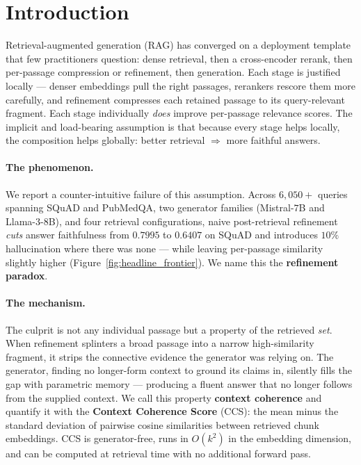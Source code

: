 \section{Introduction}
\label{sec:intro}

Retrieval-augmented generation (RAG) has converged on a deployment
template that few practitioners question: dense retrieval, then a
cross-encoder rerank, then per-passage compression or refinement,
then generation. Each stage is justified locally --- denser embeddings
pull the right passages, rerankers rescore them more carefully, and
refinement compresses each retained passage to its query-relevant
fragment. Each stage individually \emph{does} improve per-passage
relevance scores. The implicit and load-bearing assumption is that
because every stage helps locally, the composition helps globally:
better retrieval $\Rightarrow$ more faithful answers.

\paragraph{The phenomenon.} We report a counter-intuitive failure of
this assumption. Across $6{,}050+$ queries spanning SQuAD and
PubMedQA, two generator families (Mistral-$7$B and Llama-$3$-$8$B), and
four retrieval configurations, naive post-retrieval refinement
\emph{cuts} answer faithfulness from $0.7995$ to $0.6407$ on SQuAD and
introduces $10\%$ hallucination where there was none --- while leaving
per-passage similarity slightly higher
(Figure~\ref{fig:headline_frontier}). We name this the
\textbf{refinement paradox}.

\paragraph{The mechanism.} The culprit is not any individual passage
but a property of the retrieved \emph{set}. When refinement splinters
a broad passage into a narrow high-similarity fragment, it strips the
connective evidence the generator was relying on. The generator,
finding no longer-form context to ground its claims in, silently fills
the gap with parametric memory --- producing a fluent answer that no
longer follows from the supplied context. We call this property
\textbf{context coherence} and quantify it with the
\textbf{Context Coherence Score} (CCS): the mean minus the standard
deviation of pairwise cosine similarities between retrieved chunk
embeddings. CCS is generator-free, runs in $O(k^{2})$ in the embedding
dimension, and can be computed at retrieval time with no additional
forward pass.

